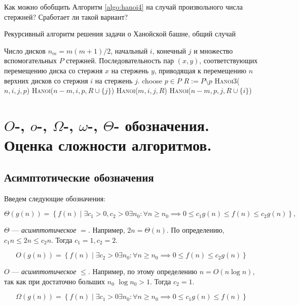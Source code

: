 \documentclass[a4paper,12pt]{article}
\begin{document}
Как можно обобщить Алгоритм \ref{algo:hanoi4} на случай произвольного числа стержней? Сработает ли такой вариант?

\begin{algorithm}[H]
	\caption{Рекурсивный алгоритм решения задачи о Ханойской башне, общий случай}
	\label{algo:hanoik}
	\begin{algorithmic}[1]
		\Require Число дисков $n_m = m(m+1)/2$, начальный $i$, конечный $j$ и множество вспомогательных $P$ стержней.
		\Ensure Последовательность пар $(x, y)$, соответствующих перемещению диска со стержня $x$ на стержень $y$, приводящая к перемещению $n$ верхних дисков со стержня $i$ на стержень $j$.
				\State choose $p \in P$
				\State $R \mathrel{:=} P \setminus p$
					\State \textsc{Hanoi3}($n,i,j,p$)
				\Else
					\State \textsc{Hanoi}($n-m,i,p,R \cup \{j\}$)
					\State \textsc{Hanoi}($m,i,j,R$)
					\State \textsc{Hanoi}($n-m,p,j,R \cup \{i\}$)
				\EndIf
			\EndIf
		\EndFunction
	\end{algorithmic}
\end{algorithm}
\newpage
\section{$O$-, $o$-, $\Omega$-, $\omega$-, $\Theta$- обозначения. Оценка сложности алгоритмов.}

\subsection{Асимптотические обозначения}

Введем следующие обозначения:

\[\Theta(g(n)) = \left\{ f(n)\mid \exists c_1>0, c_2>0 \exists n_0: \forall n \geqslant n_0 \implies 0\leqslant c_1g(n)\leqslant f(n) \leqslant c_2g(n) \right\},\]

$\Theta$ --- \emph{асимптотическое} $=$. Например, $2n = \Theta(n)$. По определению, $c_1n \leqslant 2n \leqslant c_2n$. Тогда $c_1 = 1, c_2 = 2$.

\[O(g(n)) = \left\{ f(n)\mid \exists  c_2>0 \exists n_0: \forall n \geqslant n_0 \implies 0\leqslant f(n) \leqslant c_2g(n) \right\}\]

$O$ --- \emph{асимптотическое} $\leqslant$. Например, по этому определению $n = O(n \log{n})$, так как при достаточно больших $n_0$ $\log n_0 > 1$. Тогда $c_2 = 1$.

\[\Omega(g(n)) = \left\{ f(n)\mid \exists c_1>0 \exists n_0: \forall n \geqslant n_0 \implies 0\leqslant c_1g(n)\leqslant f(n) \right\}\]
\end{document}
